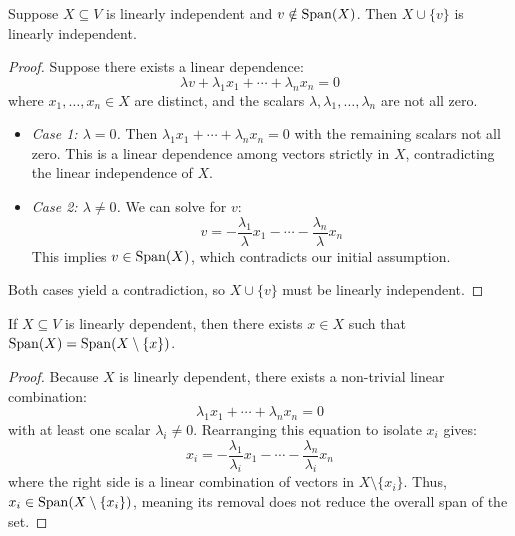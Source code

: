 \documentclass[../linear_algebra_and_groups.tex]{subfiles}
\begin{document}
\begin{lemma}
\label{lem:extendlinindep}
    \begin{shaded*}
        Suppose $X \subseteq V$ is linearly independent and $v \notin \operatorname{Span}(X)$. Then $X \cup \{v\}$ is linearly independent.
    \end{shaded*}
\end{lemma}
\begin{proof}
    Suppose there exists a linear dependence:
    \[ \lambda v + \lambda_1 x_1 + \cdots + \lambda_n x_n = 0 \]
    where $x_1, \dots, x_n \in X$ are distinct, and the scalars $\lambda, \lambda_1, \dots, \lambda_n$ are not all zero.
    \begin{itemize}
        \item \textit{Case 1: $\lambda = 0$.} Then $\lambda_1 x_1 + \cdots + \lambda_n x_n = 0$ with the remaining scalars not all zero. This is a linear dependence among vectors strictly in $X$, contradicting the linear independence of $X$.
        \item \textit{Case 2: $\lambda \ne 0$.} We can solve for $v$:
        \[ v = -\frac{\lambda_1}{\lambda}x_1 - \cdots - \frac{\lambda_n}{\lambda}x_n \]
        This implies $v \in \operatorname{Span}(X)$, which contradicts our initial assumption.
    \end{itemize}
    Both cases yield a contradiction, so $X \cup \{v\}$ must be linearly independent.
    \qedhere
\end{proof}

\begin{lemma}
\label{lem:shrinklindep}
    \begin{shaded*}
        If $X \subseteq V$ is linearly dependent, then there exists $x \in X$ such that $\operatorname{Span}(X) = \operatorname{Span}(X \setminus \{x\})$.
    \end{shaded*}
\end{lemma}
\begin{proof}
    Because $X$ is linearly dependent, there exists a non-trivial linear combination:
    \[ \lambda_1 x_1 + \cdots + \lambda_n x_n = 0 \]
    with at least one scalar $\lambda_i \ne 0$. Rearranging this equation to isolate $x_i$ gives:
    \[ x_i = -\frac{\lambda_1}{\lambda_i}x_1 - \cdots - \frac{\lambda_n}{\lambda_i}x_n \]
    where the right side is a linear combination of vectors in $X \setminus \{x_i\}$. Thus, $x_i \in \operatorname{Span}(X \setminus \{x_i\})$, meaning its removal does not reduce the overall span of the set.
    \qedhere
\end{proof}
\end{document}
